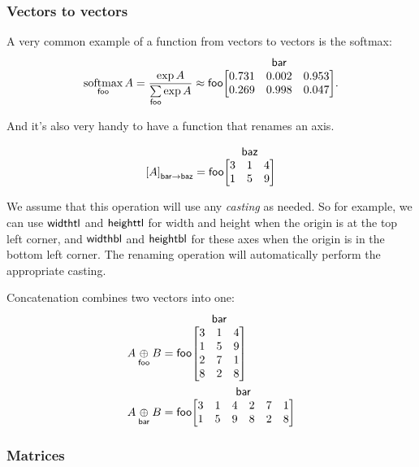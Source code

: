 \documentclass{article}
\makeatletter
\newcommand{\nmatrix}[3]{\name{#1}\begin{array}[b]{@{}c@{}}\name{#2}\\\begin{bmatrix}#3\end{bmatrix}\end{array}}
\makeatother
\begin{document}
\subsubsection{Vectors to vectors}

A very common example of a function from vectors to vectors is the softmax:
\begin{equation*}
  \nfun{foo}{softmax} A = \frac{\exp A}{\nsum{foo} \exp A} \approx \nmatrix{foo}{bar}{
    0.731 & 0.002 & 0.953 \\
    0.269 & 0.998 & 0.047
  }.
\end{equation*}

And it's also very handy to have a function that renames an axis.

\begin{equation*}
\nmov{bar}{baz}{A} = \nmatrix{foo}{baz}{
  3 & 1 & 4 \\
  1 & 5 & 9
}
\end{equation*}

We assume that this operation will use any \emph{casting} as needed. 
So for example, we can use  $\mathsf{widthtl}$ and $\mathsf{heighttl}$  for width and height when the origin is at the top left corner, and 
$\mathsf{widthbl}$ and $\mathsf{heightbl}$ for these axes when the origin is in the bottom left corner. 
The renaming operation will automatically perform the appropriate casting. 



Concatenation combines two vectors into one:
\begin{align*}
  A \ncat{foo} B &= \nmatrix{foo}{bar}{
    3 & 1 & 4 \\
    1 & 5 & 9 \\
    2 & 7 & 1 \\
    8 & 2 & 8
  } \\
  A \ncat{bar} B &= \nmatrix{foo}{bar}{
    3 & 1 & 4 & 2 & 7 & 1 \\
    1 & 5 & 9 & 8 & 2 & 8
  }
\end{align*}


\subsubsection{Matrices}
\end{document}
